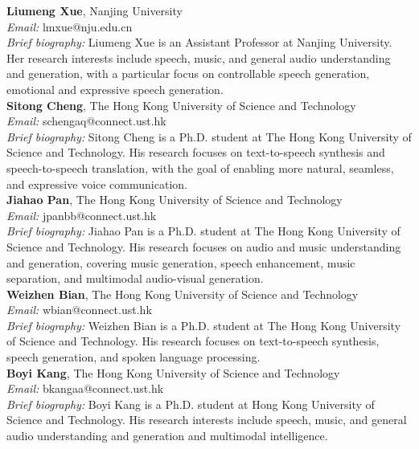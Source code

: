 \documentclass[a4paper]{article}
\begin{document}
\noindent\textbf{Liumeng Xue}, Nanjing University\\
\textit{Email:} lmxue@nju.edu.cn\\
\textit{Brief biography:} Liumeng Xue is an Assistant Professor at Nanjing University. Her research interests include speech, music, and general audio understanding and generation, with a particular focus on controllable speech generation, emotional and expressive speech generation.\\

\noindent\textbf{Sitong Cheng}, The Hong Kong University of Science and Technology\\
\textit{Email:} schengaq@connect.ust.hk\\
\textit{Brief biography:} Sitong Cheng is a Ph.D. student at The Hong Kong University of Science and Technology. His research focuses on text-to-speech synthesis and speech-to-speech translation, with the goal of enabling more natural, seamless, and expressive voice communication.\\

\noindent\textbf{Jiahao Pan}, The Hong Kong University of Science and Technology\\
\textit{Email:} jpanbb@connect.ust.hk\\
\textit{Brief biography:} Jiahao Pan is a Ph.D. student at The Hong Kong University of Science and Technology. His research focuses on audio and music understanding and generation, covering music generation, speech enhancement, music separation, and multimodal audio-visual generation. 
\\

\noindent\textbf{Weizhen Bian}, The Hong Kong University of Science and Technology\\
\textit{Email:} wbian@connect.ust.hk\\
\textit{Brief biography:} Weizhen Bian is a Ph.D. student at The Hong Kong University of Science and Technology. His research focuses on text-to-speech synthesis, speech generation, and spoken language processing.\\

\noindent\textbf{Boyi Kang}, The Hong Kong University of Science and Technology\\
\textit{Email:} bkangaa@connect.ust.hk\\
\textit{Brief biography:} Boyi Kang is a Ph.D. student at Hong Kong University of Science and Technology. His research interests include speech, music, and general audio understanding and generation and multimodal intelligence.\\
\end{document}
